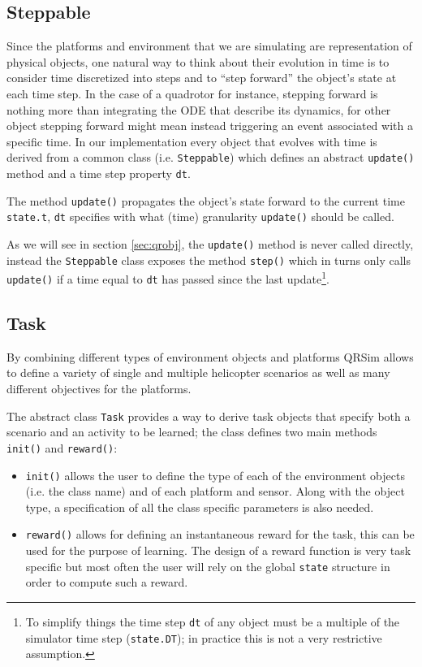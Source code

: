 \documentclass[a4paper,11pt]{report}
\newcommand{\sname}{QRSim\xspace}
\begin{document}
\subsection{Steppable}

Since the platforms and environment that we are simulating are representation of physical objects, one natural way to think about their evolution in time is to consider time discretized into steps and to ``step forward'' the object's state at each time step. In the case of a quadrotor for instance, stepping forward is nothing more than integrating the ODE that describe its dynamics, for other object stepping forward might mean instead triggering an event associated with a specific time.
In our implementation every object that evolves with time is derived from a common class (i.e. \texttt{Steppable}) which defines an abstract \texttt{update()} method and a time step property \texttt{dt}.

The method \texttt{update()} propagates the object's state forward to the current time \texttt{state.t}, \texttt{dt} specifies with what (time) granularity \texttt{update()} should be called. 

As we will see in section \ref{sec:qrobj}, the \texttt{update()} method is never called directly, instead the  \texttt{Steppable} class exposes the method \texttt{step()} which in turns only calls \texttt{update()} if a time equal to \texttt{dt} has passed since the last update\footnote{To simplify things the time step \texttt{dt} of any object must be a multiple of the simulator time step (\texttt{state.DT}); in practice this is not a very restrictive assumption.}.

\subsection{Task}

By combining different types of environment objects and platforms \sname allows to define a variety of single and multiple helicopter scenarios as well as many different objectives for the platforms.

The abstract class \texttt{Task} provides a way to derive task objects that specify both a scenario and an activity to be learned; the class defines two main methods \texttt{init()} and \texttt{reward()}:
\begin{itemize}
 \item \texttt{init()} allows the user to define the type of each of the environment objects (i.e. the class name) and of each platform and sensor. Along with the object type, a specification of all the class specific parameters is also needed.
 \item \texttt{reward()} allows for defining an instantaneous reward for the task, this can be used for the purpose of learning. The design of a reward function is very task specific but most often the user will rely on the global \texttt{state} structure in order to compute such a reward.
\end{itemize}
\end{document}
